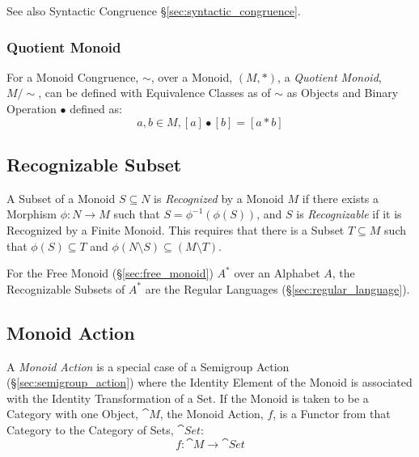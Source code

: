 See also Syntactic Congruence \S\ref{sec:syntactic_congruence}.



\subsubsection{Quotient Monoid}\label{sec:quotient_monoid}

For a Monoid Congruence, $\sim$, over a Monoid, $(M,*)$, a
\emph{Quotient Monoid}, $M/\sim$, can be defined with Equivalence
Classes as of $\sim$ as Objects and Binary Operation $\bullet$ defined
as:
\[
  a,b \in M, [a]\bullet[b] = [a*b]
\]



\subsection{Recognizable Subset}\label{sec:recognizable}

A Subset of a Monoid $S \subseteq N$ is \emph{Recognized} by a Monoid
$M$ if there exists a Morphism $\phi : N \rightarrow M$ such that $S =
\phi^{-1}(\phi(S))$, and $S$ is \emph{Recognizable} if it is
Recognized by a Finite Monoid. This requires that there is a Subset $T
\subseteq M$ such that $\phi(S) \subseteq T$ and $\phi(N \setminus S)
\subseteq (M \setminus T)$.

For the Free Monoid (\S\ref{sec:free_monoid}) $A^*$ over an Alphabet
$A$, the Recognizable Subsets of $A^*$ are the Regular Languages
(\S\ref{sec:regular_language}).



\subsection{Monoid Action}\label{sec:monoid_action}

A \emph{Monoid Action} is a special case of a Semigroup Action
(\S\ref{sec:semigroup_action}) where the Identity Element of the
Monoid is associated with the Identity Transformation of a Set. If the
Monoid is taken to be a Category with one Object, $\cat{M}$, the
Monoid Action, $f$, is a Functor from that Category to the Category of
Sets, $\cat{Set}$:
\[
  f : \cat{M} \rightarrow \cat{Set}
\]

